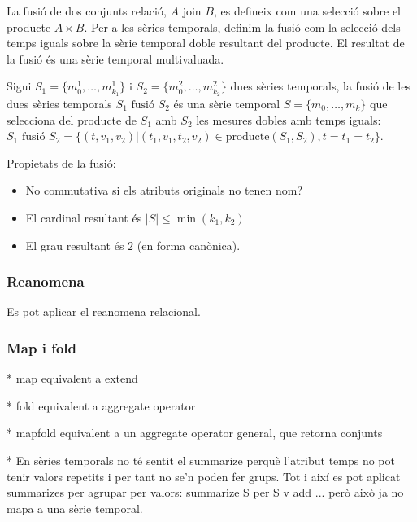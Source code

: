 La fusió de dos conjunts relació, $A \text{ join } B$, es defineix com
una selecció sobre el producte $A \times B$. Per a les sèries
temporals, definim la fusió com la selecció dels temps iguals sobre la
sèrie temporal doble resultant del producte. El resultat de la fusió
és una sèrie temporal multivaluada.
\begin{definition}[fusió]
  Sigui $S_1=\{m_0^1, \dotsc, m_{k_1}^1\}$ i $S_2=\{m_0^2, \dotsc,
  m_{k_2}^2\}$ dues sèries temporals, la fusió de les dues sèries
  temporals $S_1 \text{ fusió } S_2$ és una sèrie temporal $S=\{m_0,
  \dotsc, m_k\}$ que selecciona del producte de $S_1$ amb $S_2$ les
  mesures dobles amb temps iguals: $S_1 \text{ fusió } S_2 = \{
  (t,v_1,v_2) | (t_1,v_1,t_2,v_2) \in \text{producte}(S_1,S_2),
  t=t_1=t_2 \}$.
\end{definition}


Propietats de la fusió:
\begin{itemize}
\item No commutativa si els atributs originals no tenen nom?
\item El cardinal resultant és $|S|\leq\min(k_1,k_2)$
\item El grau resultant és $2$ (en forma canònica).
\end{itemize}



\subsubsection{Reanomena}

Es pot aplicar el reanomena relacional. 






\subsubsection{Map i fold}


* map equivalent a extend

* fold equivalent a aggregate operator 

* mapfold equivalent a un aggregate operator general, que retorna conjunts 

* En sèries temporals no té sentit el summarize perquè l'atribut temps no pot tenir valors repetits i per tant no se'n poden fer grups. Tot i així es pot aplicat summarizes per agrupar per valors: summarize S per S {v} add ...
però això ja no mapa a una sèrie temporal.


